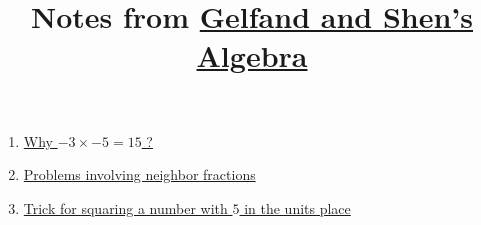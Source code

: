 \documentclass[12pt]{article}
\title{Notes from \href{https://archive.org/details/algebra_gelfand/mode/2up}{Gelfand and Shen's Algebra}}
\date{}
\begin{document}
\maketitle

\begin{enumerate}

\item 	\href{https://github.com/tanv1r/math/tree/master/algebra/2004_gelfand_shen/negative_times_negative/negative_times_negative.pdf}{Why $-3 \times -5 = 15$ ?}

\item \href{https://github.com/tanv1r/math/tree/master/algebra/2004_gelfand_shen/neighbor_fractions/neighbor_fractions.pdf}{Problems involving neighbor fractions}

\item \href{https://github.com/tanv1r/math/tree/master/algebra/2004_gelfand_shen/units_five_square_trick/units_five_square_trick.pdf}{Trick for squaring a number with $5$ in the units place}

\end{enumerate}
\end{document}
